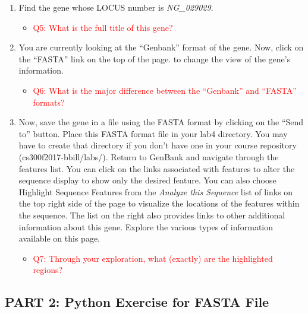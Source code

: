 \begin{enumerate}
	\item Find the gene whose LOCUS number is \emph{NG\_029029}.
	\begin{itemize}
		\item \textcolor{red}{ Q5: What is the full title of this gene?}
	\end{itemize}
	
	

	\item  You are currently looking at the ``Genbank'' format of the gene. Now, click on the ``FASTA'' link on the top of the page. to change the view of the gene's information.  
	
	\begin{itemize}
		\item \textcolor{red}{ Q6: What is the major difference between the ``Genbank'' and ``FASTA'' formats? }
	\end{itemize}
		
	\item Now, save the gene in a file using the FASTA format by clicking on the  ``Send to'' button. Place this FASTA format file in your lab4 directory. You may have to create that directory if you don't have one in your course repository (cs300f2017-bbill/labs/). Return to GenBank and navigate through the features list. You can click on the links associated with features to alter the sequence display to show only the desired feature. You can also choose Highlight Sequence Features from the \emph{Analyze this Sequence} list of links on the top right side of the page to visualize the locations of the features within the sequence. The list on the right also provides links to other additional information about this gene. Explore the various types of information available on this page. 
	\begin{itemize}
		\item \textcolor{red}{ Q7: Through your exploration, what (exactly) are the highlighted regions?}
	\end{itemize}
\end{enumerate}


\vspace*{-.1in}
\subsection*{PART 2: Python Exercise for FASTA File}
\vspace*{-.1in} 

